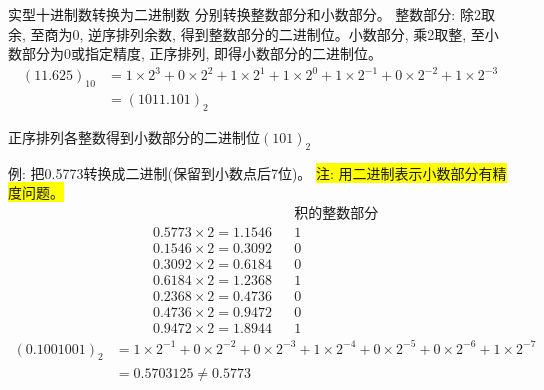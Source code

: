 \begin{frame}{实型十进制数转换为二进制数}
分别转换整数部分和小数部分。 整数部分: 除2取余, 至商为0, 逆序排列余数, 得到整数部分的二进制位。小数部分, 乘2取整, 至小数部分为0或指定精度, 正序排列, 即得小数部分的二进制位。
\begin{align*}
(11.625)_{10}&=1\times 2^3+0\times 2^2+1\times 2^1+1\times 2^0+1\times 2^{-1}+0\times 2^{-2}+1\times 2^{-3}\\
&=(1011.101)_2
\end{align*}

\begin{center}
\qquad\qquad {}\qquad\qquad {}
	
正序排列各整数得到小数部分的二进制位$(101)_2$
\end{center}
	
\end{frame}

\begin{frame}[shrink]{例: 把0.5773转换成二进制(保留到小数点后7位)。}
\colorbox{yellow}{注: 用二进制表示小数部分有精度问题。}
\begin{align*}
&                      &&\text{积的整数部分}\\
&0.5773\times 2=1.1546 && 1\\
&0.1546\times 2=0.3092 && 0\\
&0.3092\times 2=0.6184 && 0\\
&0.6184\times 2=1.2368 && 1\\
&0.2368\times 2=0.4736 && 0\\
&0.4736\times 2=0.9472 && 0\\
&0.9472\times 2=1.8944 && 1
\end{align*}
\begin{align*}
(0.1001001)_2&=1\times 2^{-1}+0\times 2^{-2}+0\times 2^{-3}+1\times 2^{-4}+0\times 2^{-5}+0\times 2^{-6}+1\times 2^{-7}\\
&=0.5703125\ne 0.5773   
\end{align*}
\end{frame}

